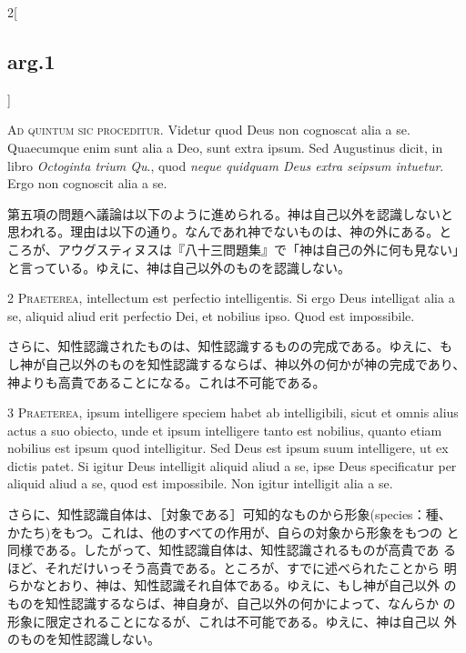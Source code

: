 \documentclass[paper=a4paper,fontsize=10pt,jafontsize=9pt,titlepage]{jlreq}
\begin{document}
\begin{paracol}{2}[\subsection{arg.1}]

{\huge A}{\scshape d quintum sic proceditur}. Videtur quod Deus non
cognoscat alia a se. Quaecumque enim sunt alia a Deo, sunt extra
ipsum. Sed Augustinus dicit, in libro {\itshape Octoginta trium Qu}.,
quod {\itshape neque quidquam Deus extra seipsum intuetur}. Ergo non
cognoscit alia a se.

\switchcolumn

第五項の問題へ議論は以下のように進められる。神は自己以外を認識しないと
思われる。理由は以下の通り。なんであれ神でないものは、神の外にある。と
ころが、アウグスティヌスは『八十三問題集』で「神は自己の外に何も見ない」
と言っている。ゆえに、神は自己以外のものを認識しない。


{\scshape 2 Praeterea}, intellectum est perfectio intelligentis. Si
ergo Deus intelligat alia a se, aliquid aliud erit perfectio Dei, et
nobilius ipso. Quod est impossibile.

\switchcolumn

さらに、知性認識されたものは、知性認識するものの完成である。ゆえに、も
し神が自己以外のものを知性認識するならば、神以外の何かが神の完成であり、
神よりも高貴であることになる。これは不可能である。


{\scshape 3 Praeterea}, ipsum intelligere speciem habet ab
intelligibili, sicut et omnis alius actus a suo obiecto, unde et ipsum
intelligere tanto est nobilius, quanto etiam nobilius est ipsum quod
intelligitur. Sed Deus est ipsum suum intelligere, ut ex dictis
patet. Si igitur Deus intelligit aliquid aliud a se, ipse Deus
specificatur per aliquid aliud a se, quod est impossibile. Non igitur
intelligit alia a se.

\switchcolumn

さらに、知性認識自体は、［対象である］可知的なものから形象(species：種、
かたち)をもつ。これは、他のすべての作用が、自らの対象から形象をもつの
と同様である。したがって、知性認識自体は、知性認識されるものが高貴であ
るほど、それだけいっそう高貴である。ところが、すでに述べられたことから
明らかなとおり、神は、知性認識それ自体である。ゆえに、もし神が自己以外
のものを知性認識するならば、神自身が、自己以外の何かによって、なんらか
の形象に限定されることになるが、これは不可能である。ゆえに、神は自己以
外のものを知性認識しない。


\end{paracol}
\end{document}

